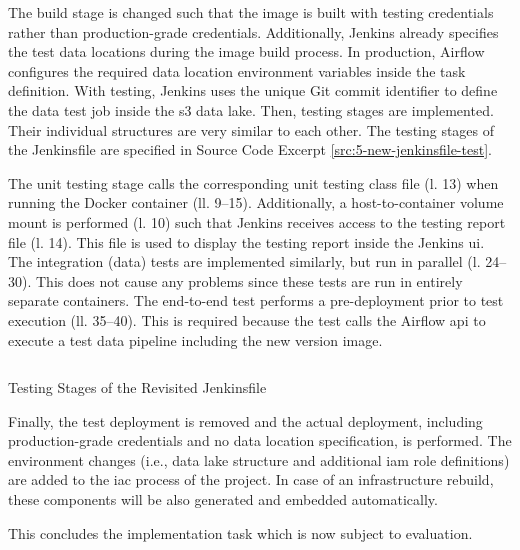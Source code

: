 The build stage is changed such that the image is built with testing credentials rather than production-grade credentials. Additionally, Jenkins already specifies the test data locations during the image build process. In production, Airflow configures the required data location environment variables inside the task definition. With testing, Jenkins uses the unique Git commit identifier to define the data test job inside the \ac{s3} data lake. Then, testing stages are implemented. Their individual structures are very similar to each other. The testing stages of the Jenkinsfile are specified in Source Code Excerpt \ref{src:5-new-jenkinsfile-test}.

The unit testing stage calls the corresponding unit testing class file (l. 13) when running the Docker container (ll. 9--15). Additionally, a host-to-container volume mount is performed (l. 10) such that Jenkins receives access to the testing report file (l. 14). This file is used to display the testing report inside the Jenkins \ac{ui}. The integration (data) tests are implemented similarly, but run in parallel (l. 24--30). This does not cause any problems since these tests are run in entirely separate containers. The end-to-end test performs a pre-deployment prior to test execution (ll. 35--40). This is required because the test calls the Airflow \acs{api} to execute a test data pipeline including the new version image.

\begin{listing}[h!]
	\inputminted{groovy}{main-matter/src/5-new-jenkinsfile-test}
	\caption{Testing Stages of the Revisited Jenkinsfile}
	\label{src:5-new-jenkinsfile-test}
\end{listing}

Finally, the test deployment is removed and the actual deployment, including production-grade credentials and no data location specification, is performed. The environment changes (i.e., data lake structure and additional \ac{iam} role definitions) are added to the \ac{iac} process of the project. In case of an infrastructure rebuild, these components will be also generated and embedded automatically.

This concludes the implementation task which is now subject to evaluation.


